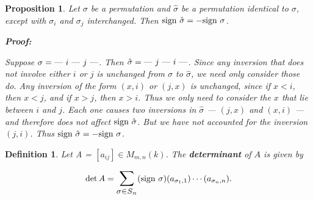 \documentclass{article}
\theoremstyle{colontheorem}
\newtheorem{proposition}[theorem]{Proposition}
\newtheorem{definition}[theorem]{Definition}
\newenvironment{Proposition}
{
	\begin{mdframed}[backgroundcolor=TheoremOrange!10]
	\begin{proposition}
}
{
	\end{proposition}
	\end{mdframed}
	
	\vspace{.15in}
}
\newenvironment{Def}
{
	\begin{mdframed}[backgroundcolor=DefGreen!10]
	\begin{definition}
}
{
	\end{definition}
	\end{mdframed}
	
	\vspace{.15in}
}
\newenvironment{Proof}
{
	\begin{mdframed}[backgroundcolor=ProofPurple!10]
	\textbf{Proof:}%
}
{
	\end{mdframed}
	
	\vspace{.085in}
}
\begin{document}
\begin{Proposition}
	
	Let $\sigma$ be a permutation and $\hat{\sigma}$ be a permutation identical to $\sigma$, except with $\sigma_i$ and $\sigma_j$ interchanged. Then $\textnormal{sign } \hat{\sigma} = -\textnormal{sign } \sigma$.
	
	\begin{Proof}
		Suppose $\sigma = \textnormal{--- } i \textnormal{ --- } j \textnormal{ ---}$. Then $\hat{\sigma} = \textnormal{--- } j \textnormal{ --- } i \textnormal{ ---}$. Since any inversion that does not involve either $i$ or $j$ is unchanged from $\sigma$ to $\hat{\sigma}$, we need only consider those do. Any inversion of the form $(x, i)$ or $(j, x)$ is unchanged, since if $x < i$, then $x < j$, and if $x > j$, then $x > i$. Thus we only need to consider the $x$ that lie between $i$ and $j$. Each one causes two inversions in $\hat{\sigma}$ --- $(j, x)$ and $(x, i)$ --- and therefore does not affect $\textnormal{sign } \hat{\sigma}$. But we have not accounted for the inversion $(j, i)$. Thus $\textnormal{sign } \hat{\sigma} = -\textnormal{sign } \sigma$.
		
	\end{Proof}
	
\end{Proposition}



\begin{Def}
	
	Let A = $[a_{ij}] \in M_{m, n}(k)$. The \textbf{determinant} of $A$ is given by
	
	$$\det A = \scaleto{\sum\limits_{\sigma \in S_n}}{7ex} (\textnormal{sign } \sigma)(a_{\sigma_1, 1}) \cdots (a_{\sigma_n, n}).$$
	
\end{Def}
\end{document}
